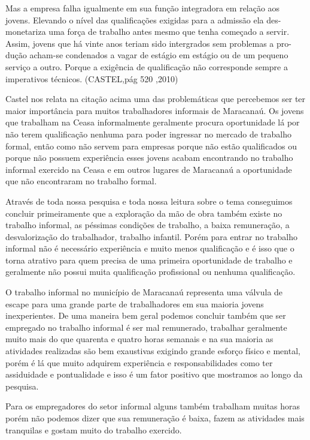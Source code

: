 \begin{citacao}
Mas a empresa falha igualmente em sua função integradora em relação aos jovens. Elevando o nível das qualificações exigidas para a admissão ela des-monetariza uma força de trabalho antes mesmo que tenha começado a servir. Assim, jovens que há vinte anos teriam sido intergrados sem problemas a pro-dução acham-se condenados a vagar de estágio em estágio ou de um pequeno serviço a outro. Porque a exigência de qualificação não corresponde sempre a imperativos técnicos. (CASTEL,pág 520 ,2010)
\end{citacao}

Castel nos relata na citação acima uma das problemáticas que percebemos ser ter maior importância para muitos trabalhadores informais de Maracanaú. Os jovens que trabalham na Ceasa informalmente geralmente procura oportunidade lá por não terem qualificação nenhuma para poder ingressar no mercado de trabalho formal, então como não servem para empresas porque não estão qualificados ou porque não possuem experiência esses jovens acabam encontrando no trabalho informal exercido na Ceasa e em outros lugares de Maracanaú a oportunidade que não encontraram no trabalho formal.

Através de toda nossa pesquisa e toda nossa leitura sobre o tema conseguimos concluir primeiramente que a exploração da mão de obra também existe no trabalho informal, as péssimas condições de trabalho, a baixa remuneração, a desvalorização do  trabalhador, trabalho infantil. Porém para entrar no trabalho informal não é necessário experiência e muito menos qualificação e é isso que o torna atrativo para quem precisa de uma primeira oportunidade de trabalho e geralmente não possui muita qualificação profissional ou nenhuma qualificação. 

O trabalho informal no município de Maracanaú representa uma válvula de escape para uma grande parte de trabalhadores em sua maioria jovens inexperientes.
De uma maneira bem geral podemos concluir também que ser empregado no trabalho informal é ser mal remunerado, trabalhar geralmente muito mais do que quarenta e quatro horas semanais e na sua maioria as atividades realizadas são bem exaustivas exigindo grande esforço físico e mental, porém é lá que muito adquirem experiência e responsabilidades como ter assiduidade e pontualidade e isso é um fator positivo que mostramos ao longo da pesquisa.

Para os empregadores do setor informal alguns também trabalham muitas horas porém não podemos dizer que sua remuneração é baixa, fazem as atividades mais tranquilas e gostam muito do trabalho exercido.

